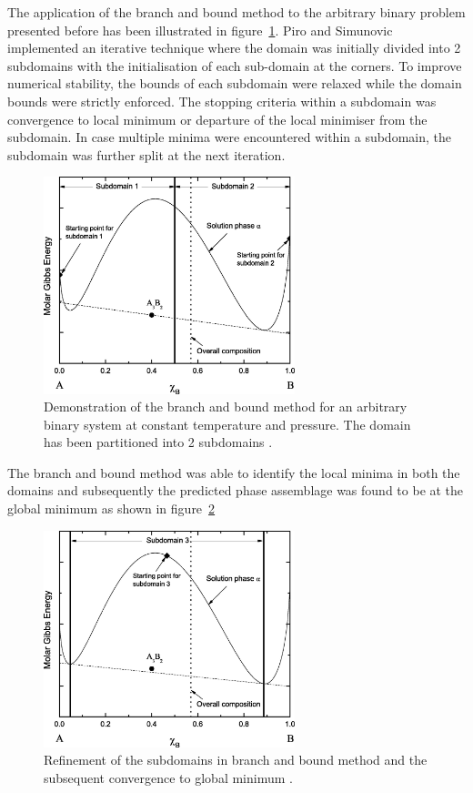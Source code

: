 	The application of the branch and bound method to the arbitrary binary problem presented before has been illustrated in figure~\ref{fig:BB_1}. Piro and Simunovic implemented an iterative technique where the domain was initially divided into 2 subdomains with the initialisation of each sub-domain at the corners. To improve numerical stability, the bounds of each subdomain were relaxed while the domain bounds were strictly enforced. The stopping criteria within a subdomain was convergence to local minimum or departure of the local minimiser from the subdomain. In case multiple minima were encountered within a subdomain, the subdomain was further split at the next iteration.

	\begin{figure}[htbp]
		\centering
		\includegraphics[width=0.65\textwidth]{figures/BB1}
		\caption{Demonstration of the branch and bound method for an arbitrary binary system at constant temperature and pressure. The domain has been partitioned into 2 subdomains \cite{Piro16}.}
		\label{fig:BB_1}
	\end{figure}

	The branch and bound method was able to identify the local minima in both the domains and subsequently the predicted phase assemblage was found to be at the global minimum as shown in figure~\ref{fig:BB_2}

		 \begin{figure}[htbp]
		\centering
		\includegraphics[width=0.65\textwidth]{figures/BB2}
		\caption{Refinement of the subdomains in branch and bound method and the subsequent convergence to global minimum \cite{Piro16}.}
		\label{fig:BB_2}
	\end{figure}

